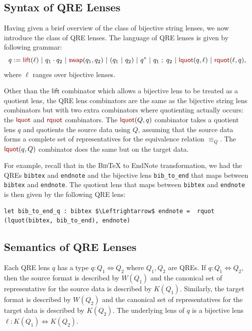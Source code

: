 \documentclass[acmsmall,review,anonymous]{acmart}
\newcommand{\kw}[1]{\textcolor{dkred}{\ensuremath{\mathsf{#1}}}}
\newcommand{\eqrel}[1]{\ensuremath{\equiv_{#1}}}
\newcommand{\sep}{\ensuremath{\ | \ }}
\newcommand{\bibtex}{\textsc{Bib}\TeX{}}
\newcommand{\swap}{\ensuremath{\kw{swap}}}
\newcommand{\lquot}{\ensuremath{\kw{lquot}}}
\newcommand{\rquot}{\ensuremath{\kw{rquot}}}
\newcommand{\lift}{\ensuremath{\kw{lift}}}
\newcommand{\cd}[1]{\lstinline[backgroundcolor=\color{white}]$#1$}
\begin{document}
\subsection{Syntax of QRE Lenses}
\label{subsec:qre-lenses-syntax}
Having given a brief overview of the class of bijective string lenses, we now
introduce the class of QRE lenses. The language of QRE lenses is given by following
grammar:
$$ q := \lift(\ell) \sep  q_1 \cdot q_2 \sep \swap(q_1, q_2) \sep (q_1 \sep q_2)
\sep q^* \sep q_1 \; ; \; q_2 \sep \lquot(q, \ell) \sep \rquot(\ell, q),$$ where
$\ell$ ranges over bijective lenses.

Other than the \kw{lift} combinator which allows a bijective lens to be
treated as a quotient lens, the QRE lens combinators are the same as the
bijective string lens combinators but with two extra combinators where
quotienting actually occurs: the $\lquot$ and $\rquot$ combinators. The
$\lquot(Q, q)$ combinator takes a quotient lens $q$ and quotients the source
data using $Q$, assuming that the source data forms a complete set of
representatives for the equivalence relation $\eqrel{Q}$. The $\lquot(q, Q)$
combinator does the same but on the target data.

For example, recall that in the \bibtex{} to EndNote transformation, we had the
QREs \cd{bibtex} and \cd{endnote} and the bijective lens \cd{bib_to_end}
that maps between 
\cd{bibtex} and \cd{endnote}. The quotient lens that maps between
\cd{bibtex} and \cd{endnote} is then given by the following QRE lens:

\begin{lstlisting}
let bib_to_end_q : bibtex $\Leftrightarrow$ endnote =  rquot (lquot(bibtex, bib_to_end), endnote)
\end{lstlisting}

\subsection{Semantics of QRE Lenses}
\label{subsec:qre-lenses-semantics}
Each QRE lens $q$ has a type $q : Q_1 \Leftrightarrow Q_2$ where $Q_1, Q_2$ are
QREs. If $q : Q_1 \Leftrightarrow Q_2$, then the source format is described by
$W(Q_1)$ and the canonical set of representative for the source data is
described by $K(Q_1)$.
Similarly, the target format is described by $W(Q_2)$ and the canonical set of
representatives for the target data is described by $K(Q_2)$. The underlying
lens of $q$ is a bijective lens $\ell : K(Q_1) \Leftrightarrow K(Q_2)$.
\end{document}
